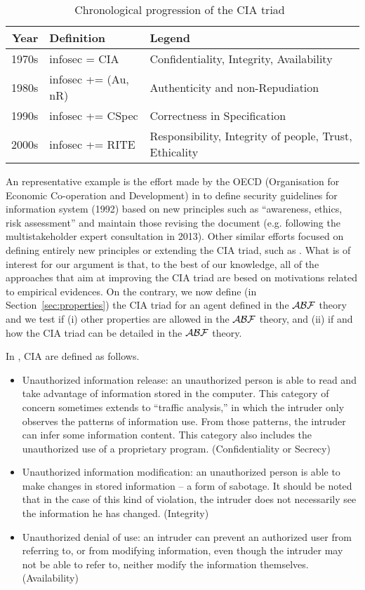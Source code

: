 \begin{table}[h]
\centering
\small
\begin{tabular}{rll} 
	{\bf Year} & {\bf Definition} & {\bf Legend}\\
	\hline
	1970s & infosec = CIA & Confidentiality, Integrity, Availability\\
	1980s & infosec += (Au, nR) & Authenticity and non-Repudiation\\
	1990s & infosec += CSpec & Correctness in Specification\\
	2000s & infosec += RITE & Responsibility, Integrity of people, Trust, Ethicality
\end{tabular}
\caption{Chronological progression of the CIA triad~\label{tab:ciaevolution}}
\end{table}


An representative example is the effort made by the OECD (Organisation for Economic
Co-operation and Development) in \autocite{OECD2013guidelines} to define
security guidelines for information system (1992) based on new principles such
as ``awareness, ethics, risk assessment'' and maintain those revising the
document (e.g.  following the multistakeholder expert consultation in 2013).
Other similar efforts focused on defining entirely new principles or extending
the CIA triad, such as \autocite{NISTSP800-160}. What is of interest for our
argument is that, to the best of our knowledge, all of the approaches that aim
at improving the CIA triad are besed on motivations related to empirical evidences. On the contrary,
we now define (in Section~\ref{sec:properties}) the CIA triad for an agent
defined in the $\mathcal{A}\mathcal{B}\mathcal{F}$ theory and we test if (i) other properties are
allowed in the $\mathcal{A}\mathcal{B}\mathcal{F}$ theory, and (ii) if and how the CIA triad can be
detailed in the $\mathcal{A}\mathcal{B}\mathcal{F}$ theory.

In \autocite{Anderson1972report,Samonas2014cia}, CIA are defined as follows.
\begin{itemize}
	\item Unauthorized information release: an unauthorized person is able
		to read and take  advantage  of  information  stored  in  the
		computer.  This  category of concern  sometimes  extends  to
		``traffic  analysis,''  in  which  the intruder  only observes
		the  patterns  of  information  use.  From  those patterns,
		the  intruder can   infer   some   information   content.
		This category   also   includes   the unauthorized use of a
		proprietary program.  (Confidentiality or Secrecy) 
	\item Unauthorized  information  modification:  an  unauthorized person
		is  able  to make changes in stored information -- a form  of
		sabotage.  It should be noted that in the case of this kind of
		violation, the intruder does not necessarily see the
		information he has changed.  (Integrity)
	\item Unauthorized  denial  of  use:  an  intruder  can  prevent  an
		authorized  user  from referring to, or from modifying
		information, even though the intruder may not be able to refer
		to, neither modify the information themselves. (Availability)
\end{itemize}

